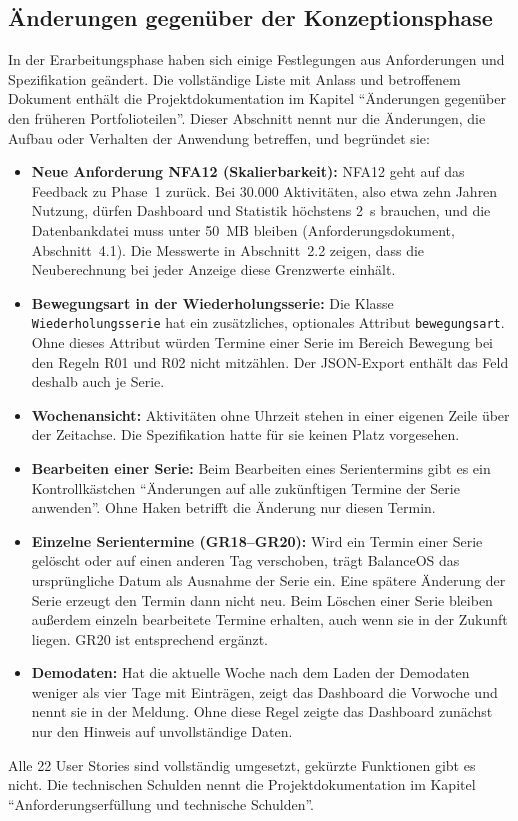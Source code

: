\subsection{Änderungen gegenüber der Konzeptionsphase}
In der Erarbeitungsphase haben sich einige Festlegungen aus Anforderungen und Spezifikation geändert. Die vollständige Liste mit Anlass und betroffenem Dokument enthält die Projektdokumentation im Kapitel \enquote{Änderungen gegenüber den früheren Portfolioteilen}. Dieser Abschnitt nennt nur die Änderungen, die Aufbau oder Verhalten der Anwendung betreffen, und begründet sie:
\begin{itemize}
  \item \textbf{Neue Anforderung NFA12 (Skalierbarkeit):} NFA12 geht auf das Feedback zu Phase~1 zurück. Bei 30.000 Aktivitäten, also etwa zehn Jahren Nutzung, dürfen Dashboard und Statistik höchstens 2~s brauchen, und die Datenbankdatei muss unter 50~MB bleiben (Anforderungsdokument, Abschnitt~4.1). Die Messwerte in Abschnitt~2.2 zeigen, dass die Neuberechnung bei jeder Anzeige diese Grenzwerte einhält.
  \item \textbf{Bewegungsart in der Wiederholungsserie:} Die Klasse \texttt{Wiederholungsserie} hat ein zusätzliches, optionales Attribut \texttt{bewegungsart}. Ohne dieses Attribut würden Termine einer Serie im Bereich Bewegung bei den Regeln R01 und R02 nicht mitzählen. Der JSON-Export enthält das Feld deshalb auch je Serie.
  \item \textbf{Wochenansicht:} Aktivitäten ohne Uhrzeit stehen in einer eigenen Zeile über der Zeitachse. Die Spezifikation hatte für sie keinen Platz vorgesehen.
  \item \textbf{Bearbeiten einer Serie:} Beim Bearbeiten eines Serientermins gibt es ein Kontrollkästchen \enquote{Änderungen auf alle zukünftigen Termine der Serie anwenden}. Ohne Haken betrifft die Änderung nur diesen Termin.
  \item \textbf{Einzelne Serientermine (GR18--GR20):} Wird ein Termin einer Serie gelöscht oder auf einen anderen Tag verschoben, trägt BalanceOS das ursprüngliche Datum als Ausnahme der Serie ein. Eine spätere Änderung der Serie erzeugt den Termin dann nicht neu. Beim Löschen einer Serie bleiben außerdem einzeln bearbeitete Termine erhalten, auch wenn sie in der Zukunft liegen. GR20 ist entsprechend ergänzt.
  \item \textbf{Demodaten:} Hat die aktuelle Woche nach dem Laden der Demodaten weniger als vier Tage mit Einträgen, zeigt das Dashboard die Vorwoche und nennt sie in der Meldung. Ohne diese Regel zeigte das Dashboard zunächst nur den Hinweis auf unvollständige Daten.
\end{itemize}
Alle 22 User Stories sind vollständig umgesetzt, gekürzte Funktionen gibt es nicht. Die technischen Schulden nennt die Projektdokumentation im Kapitel \enquote{Anforderungserfüllung und technische Schulden}.
